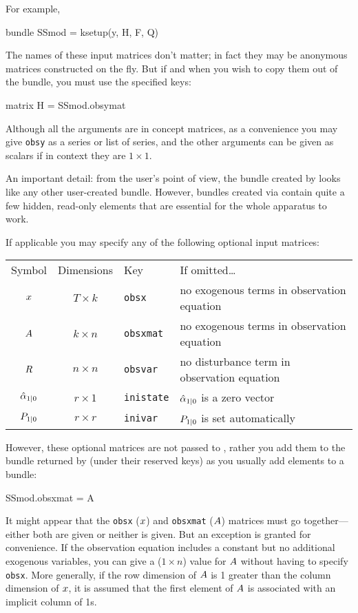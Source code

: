 \documentclass[a4paper]{article}
\begin{document}
For example,
\begin{code}
bundle SSmod = ksetup(y, H, F, Q)
\end{code} 

The names of these input matrices don't matter; in fact they may be
anonymous matrices constructed on the fly. But if and when you wish to
copy them out of the bundle, you must use the specified keys:
\begin{code}
matrix H = SSmod.obsymat
\end{code}

Although all the arguments are in concept matrices, as a convenience
you may give \texttt{obsy} as a series or list of series, and the
other arguments can be given as scalars if in context they are
$1 \times 1$.

An important detail: from the user's point of view, the bundle created
by  looks like any other user-created bundle. However,
bundles created via  contain quite a few hidden,
read-only elements that are essential for the whole apparatus to work.

If applicable you may specify any of the following optional input
matrices:

\begin{center}
\begin{tabular}{ccll}
Symbol & Dimensions & Key & If omitted\dots \\[6pt]
$x$ & $T \times k$ & \texttt{obsx} &
 no exogenous terms in observation equation\\
$A$ & $k \times n$ & \texttt{obsxmat} &
 no exogenous terms in observation equation\\ 
$R$ & $n \times n$ & \texttt{obsvar} & 
 no disturbance term in observation equation \\
$\hat{\alpha}_{1|0}$ & $r \times 1$ & \texttt{inistate} &
 $\hat{\alpha}_{1|0}$ is a zero vector\\
$P_{1|0}$ & $r \times r$ & \texttt{inivar} &
 $P_{1|0}$ is set automatically
\end{tabular}
\end{center}

However, these optional matrices are not passed to ,
rather you add them to the bundle returned by  (under
their reserved keys) as you usually add elements to a bundle:
\begin{code}
SSmod.obsxmat = A
\end{code}

It might appear that the \texttt{obsx} ($x$) and \texttt{obsxmat}
($A$) matrices must go together---either both are given or
neither is given.  But an exception is granted for convenience.  If
the observation equation includes a constant but no additional
exogenous variables, you can give a ($1 \times n$) value for
$A$ without having to specify \texttt{obsx}.  More generally,
if the row dimension of $A$ is 1 greater than the column
dimension of $x$, it is assumed that the first element of
$A$ is associated with an implicit column of 1s.
\end{document}
